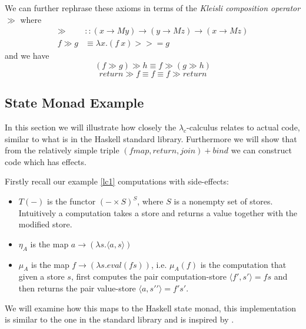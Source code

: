 We can further rephrase these axioms in terms
of the \textit{Kleisli composition operator} $\gg$ where
\begin{align}
    \gg &:: (x \rightarrow M y) \rightarrow (y \rightarrow M z) \rightarrow (x \rightarrow M z) \\
    f \gg g &\equiv \lambda x. (f\ x) >>= g
\end{align}
and we have
\begin{equation}
    (f \gg g) \gg h \equiv f \gg (g \gg h)
\end{equation}
\begin{equation}
    return \gg f \equiv f \equiv f \gg return
\end{equation}

\subsection{State Monad Example}
In this section we will illustrate how closely 
the $\lambda_c$-calculus relates to actual code,
similar to what is in the Haskell standard library.
Furthermore we will show that from the relatively
simple triple $(fmap,return,join) + bind$ we can
construct code which has effects.

Firstly recall our example \ref{lc1}
computations with side-effects:
\begin{itemize}
    \item $T(-)$ is the functor $(-\times S)^S$, where $S$ is a nonempty set of stores.
        Intuitively a computation takes a store and returns a value together with the modified store.
    \item $\eta_A$ is the map $a \rightarrow (\lambda s.\langle a,s \rangle)$
    \item $\mu_A$ is the map $f \rightarrow (\lambda s.eval(fs))$,
        i.e. $\mu_A(f)$ is the computation that given a store $s$,
        first computes the pair computation-store $\langle f\prime,s\prime\rangle = fs$
        and then returns the pair value-store $\langle a,s\prime\prime\rangle = f\prime s\prime$.
\end{itemize}

We will examine how this maps to the Haskell state monad,
this implementation is similar to the one in the standard library
and is inspired by \cite{jones1995functional}.

